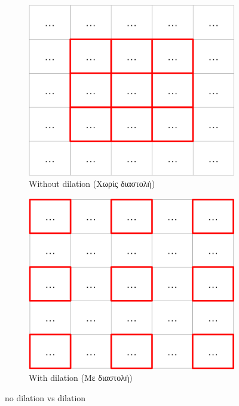 \documentclass[a4paper,12pt]{report}
\theoremstyle{definitionNODot}
\begin{document}
\begin{itemize}
		\begin{figure}[h]
			\begin{subfigure}[b]{0.4\textwidth}
				\centering
				\includegraphics[width=\textwidth]{dilationfilters_withoutdilation.png}
				\caption{Without dilation (Χωρίς διαστολή)}
				\label{fig:dilationfilters_withoutdilation}
			\end{subfigure}
			\hfill
			\begin{subfigure}[b]{0.4\textwidth}
				\centering
				\includegraphics[width=\textwidth]{dilationfilters_withdilation.png}
				\caption{With dilation (Με διαστολή)}
				\label{fig:dilationfilters_withdilation}
			\end{subfigure}
			\caption{no dilation vs dilation}
			\label{fig:dilationfilters}
		\end{figure}
		

\end{itemize}
\end{document}
